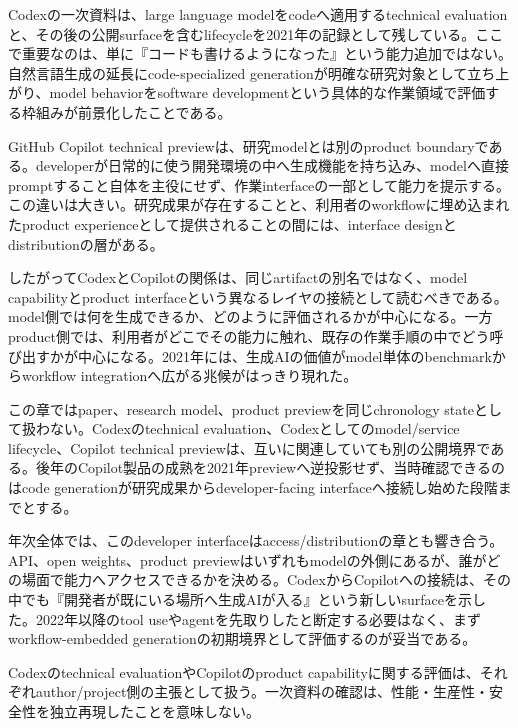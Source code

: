 
Codexの一次資料は、large language modelをcodeへ適用するtechnical evaluationと、その後の公開surfaceを含むlifecycleを2021年の記録として残している。ここで重要なのは、単に『コードも書けるようになった』という能力追加ではない。自然言語生成の延長にcode-specialized generationが明確な研究対象として立ち上がり、model behaviorをsoftware developmentという具体的な作業領域で評価する枠組みが前景化したことである。\autocite{src-47d0c87b08f0,src-5a992319f41e,src-890a73c0b288}


GitHub Copilot technical previewは、研究modelとは別のproduct boundaryである。developerが日常的に使う開発環境の中へ生成機能を持ち込み、modelへ直接promptすること自体を主役にせず、作業interfaceの一部として能力を提示する。この違いは大きい。研究成果が存在することと、利用者のworkflowに埋め込まれたproduct experienceとして提供されることの間には、interface designとdistributionの層がある。\autocite{src-089fe2c6fbb1}


したがってCodexとCopilotの関係は、同じartifactの別名ではなく、model capabilityとproduct interfaceという異なるレイヤの接続として読むべきである。model側では何を生成できるか、どのように評価されるかが中心になる。一方product側では、利用者がどこでその能力に触れ、既存の作業手順の中でどう呼び出すかが中心になる。2021年には、生成AIの価値がmodel単体のbenchmarkからworkflow integrationへ広がる兆候がはっきり現れた。\autocite{src-089fe2c6fbb1,src-47d0c87b08f0,src-5a992319f41e,src-890a73c0b288}


この章ではpaper、research model、product previewを同じchronology stateとして扱わない。Codexのtechnical evaluation、Codexとしてのmodel/service lifecycle、Copilot technical previewは、互いに関連していても別の公開境界である。後年のCopilot製品の成熟を2021年previewへ逆投影せず、当時確認できるのはcode generationが研究成果からdeveloper-facing interfaceへ接続し始めた段階までとする。\autocite{src-089fe2c6fbb1,src-47d0c87b08f0,src-5a992319f41e,src-890a73c0b288}


年次全体では、このdeveloper interfaceはaccess/distributionの章とも響き合う。API、open weights、product previewはいずれもmodelの外側にあるが、誰がどの場面で能力へアクセスできるかを決める。CodexからCopilotへの接続は、その中でも『開発者が既にいる場所へ生成AIが入る』という新しいsurfaceを示した。2022年以降のtool useやagentを先取りしたと断定する必要はなく、まずworkflow-embedded generationの初期境界として評価するのが妥当である。\autocite{src-089fe2c6fbb1,src-47d0c87b08f0,src-5a992319f41e,src-890a73c0b288}


\begin{claimboundary}
Codexのtechnical evaluationやCopilotのproduct capabilityに関する評価は、それぞれauthor/project側の主張として扱う。一次資料の確認は、性能・生産性・安全性を独立再現したことを意味しない。\autocite{src-089fe2c6fbb1,src-47d0c87b08f0,src-5a992319f41e,src-890a73c0b288}
\end{claimboundary}
